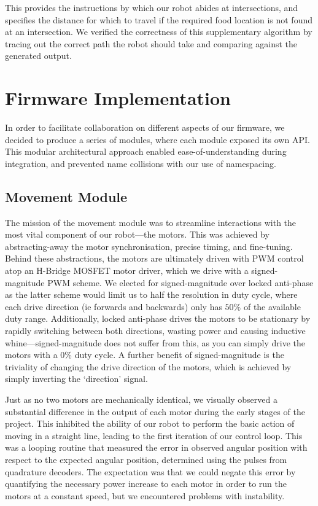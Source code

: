 \documentclass[conference]{IEEEtran}
\begin{document}
This provides the instructions by which our robot abides at intersections, and specifies the distance for which to travel if the required food location is not found at an intersection.
We verified the correctness of this supplementary algorithm by tracing out the correct path the robot should take and comparing against the generated output.



\section{Firmware Implementation}

In order to facilitate collaboration on different aspects of our firmware, we decided to produce a series of modules, where each module exposed its own API.
This modular architectural approach enabled ease-of-understanding during integration, and prevented name collisions with our use of namespacing.

\subsection{Movement Module}

The mission of the movement module was to streamline interactions with the most vital component of our robot—the motors.
This was achieved by abstracting-away the motor synchronisation, precise timing, and fine-tuning.
Behind these abstractions, the motors are ultimately driven with PWM control atop an H-Bridge MOSFET motor driver, which we drive with a signed-magnitude PWM scheme.
We elected for signed-magnitude over locked anti-phase as the latter scheme would limit us to half the resolution in duty cycle, where each drive direction (ie forwards and backwards) only has $50\%$ of the available duty range.
Additionally, locked anti-phase drives the motors to be stationary by rapidly switching between both directions, wasting power and causing inductive whine—signed-magnitude does not suffer from this, as you can simply drive the motors with a $0\%$ duty cycle.
A further benefit of signed-magnitude is the triviality of changing the drive direction of the motors, which is achieved by simply inverting the `direction' signal.

Just as no two motors are mechanically identical, we visually observed a substantial difference in the output of each motor during the early stages of the project.
This inhibited the ability of our robot to perform the basic action of moving in a straight line, leading to the first iteration of our control loop.
This was a looping routine that measured the error in observed angular position with respect to the expected angular position, determined using the pulses from quadrature decoders.
The expectation was that we could negate this error by quantifying the necessary power increase to each motor in order to run the motors at a constant speed, but we encountered problems with instability.
\end{document}
